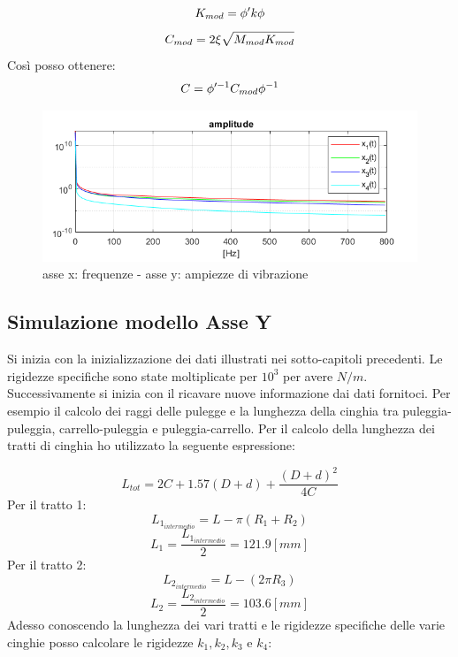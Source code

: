 \documentclass{article}
\begin{document}
\begin{equation*}
\centering
    K_{mod} = \phi' k \phi
\end{equation*}
\begin{equation*}
\centering
    C_{mod} = 2 \xi \sqrt{M_{mod}K_{mod}}
\end{equation*}
Così posso ottenere:
\begin{equation*}
\centering
    C = \phi'^{-1} C_{mod} \phi^{-1}
\end{equation*}
\begin{figure}[H]
\centering
\includegraphics[width=.8\textwidth]{./assex/plot_c.png}
\caption{ asse x: frequenze - asse y: ampiezze di vibrazione}
\end{figure}
\subsection{Simulazione modello Asse Y}
Si inizia con la inizializzazione dei dati illustrati nei sotto-capitoli precedenti. Le rigidezze specifiche sono state moltiplicate per $10^3 $ per avere $N/m$. Successivamente si inizia con il ricavare nuove informazione dai dati fornitoci. Per esempio il calcolo dei raggi delle pulegge e la lunghezza della cinghia tra puleggia-puleggia, carrello-puleggia e puleggia-carrello.
Per il calcolo della lunghezza dei tratti di cinghia ho utilizzato
la seguente espressione:

\begin{equation*}
L_{tot} = 2C +1.57(D+d) + \frac{(D+d)^2}{4C}
\end{equation*}
Per il tratto 1:
\begin{equation}
L_{1_{intermedio}} = L-\pi(R_1 + R_2)
\end{equation}
\begin{equation}
L_{1} = \frac{L_{1_{intermedio}}}{2} = 121.9 [mm]
\end{equation}
Per il tratto 2:
\begin{equation}
L_{2_{intermedio}} = L-(2\pi R_3)
\end{equation}
\begin{equation}
L_{2} = \frac{L_{2_{intermedio}}}{2} = 103.6 [mm]
\end{equation}
Adesso conoscendo la lunghezza dei vari tratti e le rigidezze specifiche delle varie cinghie posso calcolare le rigidezze $k_{1},k_{2},k_{3}$ e $k_{4}$:
\end{document}

